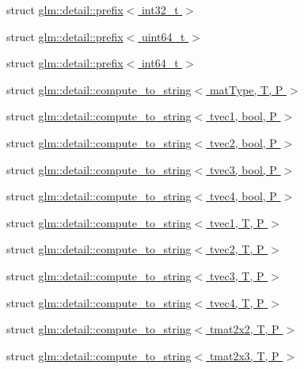 \begin{DoxyCompactItemize}
\item 
struct \hyperlink{structglm_1_1detail_1_1prefix_3_01int32__t_01_4}{glm\-::detail\-::prefix$<$ int32\-\_\-t $>$}
\item 
struct \hyperlink{structglm_1_1detail_1_1prefix_3_01uint64__t_01_4}{glm\-::detail\-::prefix$<$ uint64\-\_\-t $>$}
\item 
struct \hyperlink{structglm_1_1detail_1_1prefix_3_01int64__t_01_4}{glm\-::detail\-::prefix$<$ int64\-\_\-t $>$}
\item 
struct \hyperlink{structglm_1_1detail_1_1compute__to__string}{glm\-::detail\-::compute\-\_\-to\-\_\-string$<$ mat\-Type, T, P $>$}
\item 
struct \hyperlink{structglm_1_1detail_1_1compute__to__string_3_01tvec1_00_01bool_00_01_p_01_4}{glm\-::detail\-::compute\-\_\-to\-\_\-string$<$ tvec1, bool, P $>$}
\item 
struct \hyperlink{structglm_1_1detail_1_1compute__to__string_3_01tvec2_00_01bool_00_01_p_01_4}{glm\-::detail\-::compute\-\_\-to\-\_\-string$<$ tvec2, bool, P $>$}
\item 
struct \hyperlink{structglm_1_1detail_1_1compute__to__string_3_01tvec3_00_01bool_00_01_p_01_4}{glm\-::detail\-::compute\-\_\-to\-\_\-string$<$ tvec3, bool, P $>$}
\item 
struct \hyperlink{structglm_1_1detail_1_1compute__to__string_3_01tvec4_00_01bool_00_01_p_01_4}{glm\-::detail\-::compute\-\_\-to\-\_\-string$<$ tvec4, bool, P $>$}
\item 
struct \hyperlink{structglm_1_1detail_1_1compute__to__string_3_01tvec1_00_01_t_00_01_p_01_4}{glm\-::detail\-::compute\-\_\-to\-\_\-string$<$ tvec1, T, P $>$}
\item 
struct \hyperlink{structglm_1_1detail_1_1compute__to__string_3_01tvec2_00_01_t_00_01_p_01_4}{glm\-::detail\-::compute\-\_\-to\-\_\-string$<$ tvec2, T, P $>$}
\item 
struct \hyperlink{structglm_1_1detail_1_1compute__to__string_3_01tvec3_00_01_t_00_01_p_01_4}{glm\-::detail\-::compute\-\_\-to\-\_\-string$<$ tvec3, T, P $>$}
\item 
struct \hyperlink{structglm_1_1detail_1_1compute__to__string_3_01tvec4_00_01_t_00_01_p_01_4}{glm\-::detail\-::compute\-\_\-to\-\_\-string$<$ tvec4, T, P $>$}
\item 
struct \hyperlink{structglm_1_1detail_1_1compute__to__string_3_01tmat2x2_00_01_t_00_01_p_01_4}{glm\-::detail\-::compute\-\_\-to\-\_\-string$<$ tmat2x2, T, P $>$}
\item 
struct \hyperlink{structglm_1_1detail_1_1compute__to__string_3_01tmat2x3_00_01_t_00_01_p_01_4}{glm\-::detail\-::compute\-\_\-to\-\_\-string$<$ tmat2x3, T, P $>$}

\end{DoxyCompactItemize}
